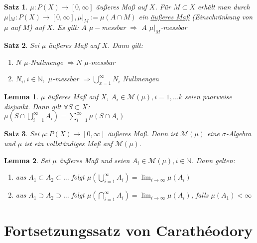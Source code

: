\documentclass[11pt]{memoir}
\theoremstyle{changebreak}
\newtheorem{Lemma}{Lemma}[chapter]
\newtheorem{Satz}{Satz}[chapter]
\begin{document}
\begin{Satz}
$\mu: P(X) \rightarrow [0, \infty]$ äußeres Maß auf $X$. Für $M \subset X$ erhält man durch $\mu|_M : P(X) \rightarrow [0, \infty], \mu|_M := \mu(A \cap M)$ ein \underline{äußeres Maß} (Einschränkung von $\mu$ auf $M$) auf $X$. Es gilt: $A$ $ \mu-$messbar $\Rightarrow$  $A$ $ \mu|_M $-messbar
\end{Satz}

\begin{Satz}
Sei $\mu$ äußeres Maß auf $X$. Dann gilt:
\begin{enumerate}
	\item $N$ $\mu$-Nullmenge $\Rightarrow N$ $\mu$-messbar
	\item $N_i, i \in \mathbb N,$ $\mu$-messbar $\Rightarrow \bigcup\limits_{x=1}^\infty N_i$ Nullmengen
\end{enumerate}
\end{Satz}


\begin{Lemma}
$\mu$ äußeres Maß auf $X$, $A_i \in \mathscr M(\mu), i = 1, ... k$ seien paarweise disjunkt. Dann gilt $\forall S \subset X$: \\
$\mu\left(S \cap \bigcup\limits_{i=1}^\infty A_i\right) = \sum\limits_{i=1}^\infty \mu(S \cap A_i)$
\end{Lemma}

\begin{Satz}
Sei $\mu: P(X) \rightarrow [0, \infty]$ äußeres Maß. Dann ist $\mathscr M(\mu)$ eine $\sigma$-Algebra und $\mu$ ist ein vollständiges Maß auf $\mathscr M(\mu)$.
\end{Satz}

\begin{Lemma}
Sei $\mu$ äußeres Maß und seien $A_i \in \mathscr M(\mu), i \in \mathbb N$. Dann gelten:
\begin{enumerate}
	\item aus $A_1 \subset A_2 \subset ...$ folgt $\mu\left(\bigcup\limits_{i=1}^\infty A_i\right) = \lim_{i \rightarrow \infty} \mu(A_i)$
	\item aus $A_1 \supset A_2 \supset ...$ folgt $\mu\left(\bigcap\limits_{i=1}^\infty A_i\right) = \lim_{i \rightarrow \infty} \mu(A_i)$, falls $\mu(A_1) \less \infty$
\end{enumerate}
\end{Lemma}


\section{Fortsetzungssatz von Carathéodory}
\end{document}
